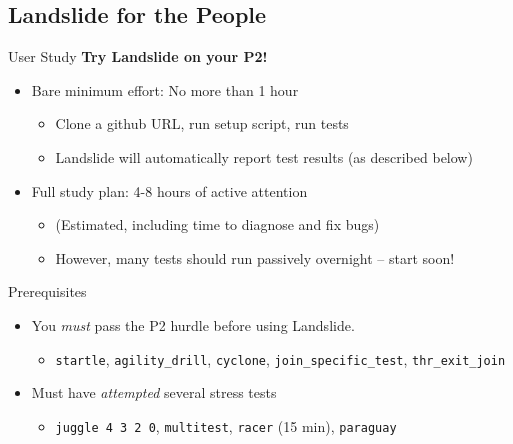 \documentclass[xcolor=dvipsnames]{beamer}
\begin{document}

\subsection{Landslide for the People}

\begin{frame}{User Study}
	\textbf{Try Landslide on your P2!}
	\begin{itemize}
		\item Bare minimum effort: No more than 1 hour
		\begin{itemize}
			\item Clone a github URL, run setup script, run tests %
			\item Landslide will automatically report test results (as described below)
		\end{itemize}
		\item Full study plan: 4-8 hours of active attention
		\begin{itemize}
			\item (Estimated, including time to diagnose and fix bugs)
			\item However, many tests should run passively overnight -- start soon!
		\end{itemize}
	\end{itemize}
	\pause
	\linegap

	Prerequisites
	\begin{itemize}
		\item You {\em must} pass the P2 hurdle before using Landslide.
		\begin{itemize}
			\item {\tt startle}, {\tt agility\_drill}, {\tt cyclone}, {\tt join\_specific\_test}, {\tt thr\_exit\_join}
		\end{itemize}
		\item Must have {\em attempted} several stress tests
		\begin{itemize}
			\item {\tt juggle 4 3 2 0}, {\tt multitest}, {\tt racer} (15 min), {\tt paraguay}
		\end{itemize}

	\end{itemize}
\end{frame}
\end{document}
